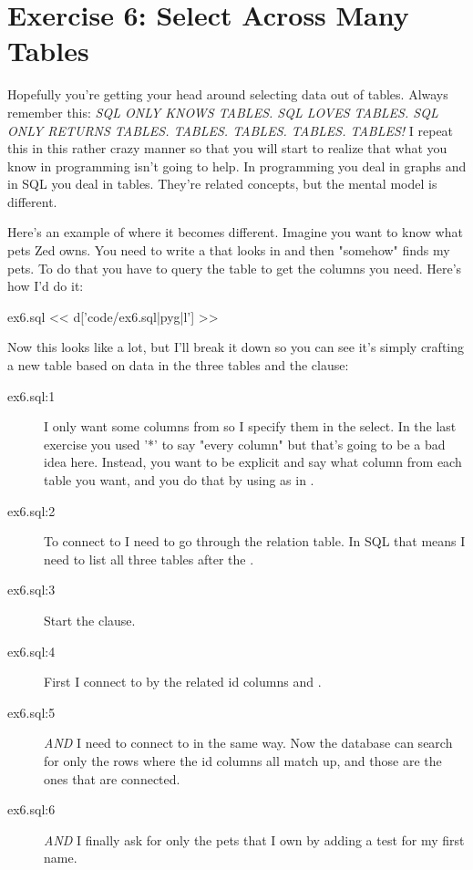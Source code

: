 \chapter{Exercise 6: Select Across Many Tables}

Hopefully you're getting your head around selecting data out of tables.  Always
remember this: \emph{SQL ONLY KNOWS TABLES. SQL LOVES TABLES. SQL ONLY RETURNS
    TABLES. TABLES. TABLES. TABLES. TABLES!}  I repeat this in this rather
crazy manner so that you will start to realize that what you know in programming
isn't going to help.  In programming you deal in graphs and in SQL you deal in
tables.  They're related concepts, but the mental model is different.

Here's an example of where it becomes different.  Imagine you want to 
know what pets Zed owns.  You need to write a  that 
looks in  and then "somehow" finds my pets.  To do that
you have to query the  table to get the 
columns you need.  Here's how I'd do it:

\begin{code}{ex6.sql}
<< d['code/ex6.sql|pyg|l'] >>
\end{code}

Now this looks like a lot, but I'll break it down so you can see it's
simply crafting a new table based on data in the three tables and the
 clause:

\begin{description}
\item[ex6.sql:1] I only want some columns from  so I specify them
    in the select.  In the last exercise you used '*' to say "every column"
    but that's going to be a bad idea here.  Instead, you want to be explicit
    and say what column from each table you want, and you do that by using
     as in .
\item[ex6.sql:2] To connect  to  I need to go
    through the  relation table.  In SQL that means I
    need to list all three tables after the .
\item[ex6.sql:3] Start the  clause.
\item[ex6.sql:4] First I connect  to  by the
    related id columns  and .
\item[ex6.sql:5] \emph{AND} I need to connect  to 
    in the same way. Now the database can search for only the rows where the id
    columns all match up, and those are the ones that are connected.
\item[ex6.sql:6] \emph{AND} I finally ask for only the pets that I own by adding a
     test for my first name.
\end{description}

